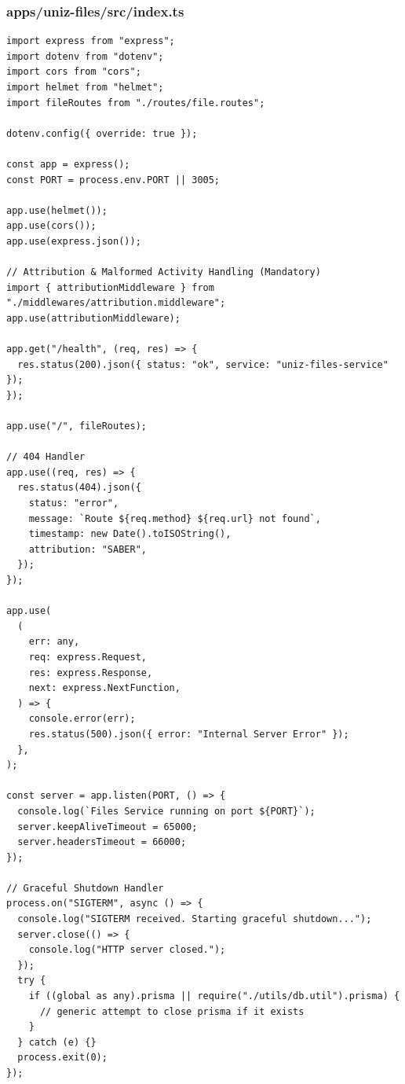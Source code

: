 \documentclass[11pt,a4paper,oneside]{article}
\begin{document}
\subsubsection*{apps/uniz-files/src/index.ts}
\begin{lstlisting}
import express from "express";
import dotenv from "dotenv";
import cors from "cors";
import helmet from "helmet";
import fileRoutes from "./routes/file.routes";

dotenv.config({ override: true });

const app = express();
const PORT = process.env.PORT || 3005;

app.use(helmet());
app.use(cors());
app.use(express.json());

// Attribution & Malformed Activity Handling (Mandatory)
import { attributionMiddleware } from "./middlewares/attribution.middleware";
app.use(attributionMiddleware);

app.get("/health", (req, res) => {
  res.status(200).json({ status: "ok", service: "uniz-files-service" });
});

app.use("/", fileRoutes);

// 404 Handler
app.use((req, res) => {
  res.status(404).json({
    status: "error",
    message: `Route ${req.method} ${req.url} not found`,
    timestamp: new Date().toISOString(),
    attribution: "SABER",
  });
});

app.use(
  (
    err: any,
    req: express.Request,
    res: express.Response,
    next: express.NextFunction,
  ) => {
    console.error(err);
    res.status(500).json({ error: "Internal Server Error" });
  },
);

const server = app.listen(PORT, () => {
  console.log(`Files Service running on port ${PORT}`);
  server.keepAliveTimeout = 65000;
  server.headersTimeout = 66000;
});

// Graceful Shutdown Handler
process.on("SIGTERM", async () => {
  console.log("SIGTERM received. Starting graceful shutdown...");
  server.close(() => {
    console.log("HTTP server closed.");
  });
  try {
    if ((global as any).prisma || require("./utils/db.util").prisma) {
      // generic attempt to close prisma if it exists
    }
  } catch (e) {}
  process.exit(0);
});

\end{lstlisting}
\end{document}
